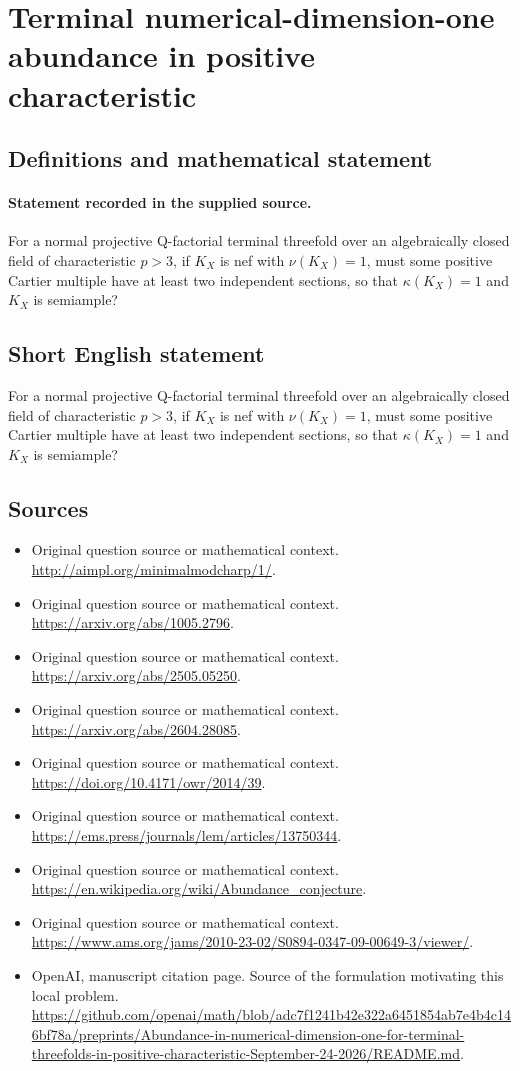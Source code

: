 \documentclass[11pt]{article}
\begin{document}
\section*{Terminal numerical-dimension-one abundance in positive characteristic}\label{statement}
\subsection{Definitions and mathematical statement}
\paragraph{Statement recorded in the supplied source.}
For a normal projective Q-factorial terminal threefold over an algebraically closed field of characteristic $p>3$, if $K_X$ is nef with $\nu (K_X)=1$, must some positive Cartier multiple have at least two independent sections, so that $\kappa (K_X)=1$ and $K_X$ is semiample?
\subsection{Short English statement}
For a normal projective Q-factorial terminal threefold over an algebraically closed field of characteristic $p>3$, if $K_X$ is nef with $\nu (K_X)=1$, must some positive Cartier multiple have at least two independent sections, so that $\kappa (K_X)=1$ and $K_X$ is semiample?
\subsection{Sources}
\begin{itemize}
\item[S1] Original question source or mathematical context.
\url{http://aimpl.org/minimalmodcharp/1/}.
\item[S2] Original question source or mathematical context.
\url{https://arxiv.org/abs/1005.2796}.
\item[S3] Original question source or mathematical context.
\url{https://arxiv.org/abs/2505.05250}.
\item[S4] Original question source or mathematical context.
\url{https://arxiv.org/abs/2604.28085}.
\item[S5] Original question source or mathematical context.
\url{https://doi.org/10.4171/owr/2014/39}.
\item[S6] Original question source or mathematical context.
\url{https://ems.press/journals/lem/articles/13750344}.
\item[S7] Original question source or mathematical context.
\url{https://en.wikipedia.org/wiki/Abundance_conjecture}.
\item[S8] Original question source or mathematical context.
\url{https://www.ams.org/jams/2010-23-02/S0894-0347-09-00649-3/viewer/}.
\item[S9] OpenAI, manuscript citation page. Source of the formulation motivating this local problem.
\url{https://github.com/openai/math/blob/adc7f1241b42e322a6451854ab7e4b4c146bf78a/preprints/Abundance-in-numerical-dimension-one-for-terminal-threefolds-in-positive-characteristic-September-24-2026/README.md}.
\end{itemize}
\end{document}
